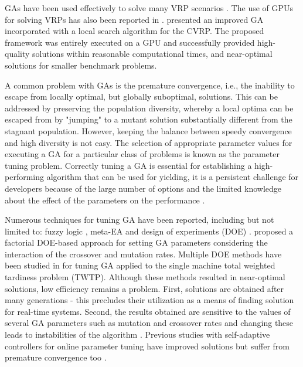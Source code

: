 \documentclass[acmsmall]{acmart}
\begin{document}
GAs have been used effectively to solve many VRP scenarios \cite{baker2003genetic, garcia2009comparison}. The use of GPUs for solving VRPs has also been reported in  \cite{rey2018cpu, wodecki2015parallel}.  \cite{abdelatti2020improved} presented an improved GA incorporated with a local search algorithm for the CVRP. The proposed framework was entirely executed on a GPU and successfully provided high-quality solutions within reasonable computational times, and near-optimal solutions for smaller benchmark problems.

A common problem with GAs is the premature convergence, i.e., the inability to escape from locally optimal, but globally suboptimal, solutions. This can be addressed by preserving the population diversity, whereby a local optima can be escaped from by "jumping" to a mutant solution substantially different from the stagnant population. However, keeping the balance between speedy convergence and high diversity is not easy. The selection of appropriate parameter values for executing a GA for a particular class of problems is known as the parameter tuning problem. Correctly tuning a GA is essential for establishing a high-performing algorithm that can be used for yielding, it is a persistent challenge for developers because of the large number of options and the limited knowledge about the effect of the parameters on the performance \cite{karafotias2014parameter}.

Numerous techniques for tuning GA have been reported, including but not limited to: fuzzy logic \cite{shirazi2016fuzzy}, meta-EA \cite{grefenstette1986optimization} and design of experiments (DOE) \cite{ arin2011comparative}. \cite{bagchi1996calibration} proposed a factorial DOE-based approach for setting GA parameters considering the interaction of the crossover and mutation rates. Multiple DOE methods have been studied in \cite{arin2011comparative} for tuning GA applied to the single machine total weighted tardiness problem (TWTP). Although these methods resulted in near-optimal solutions, low efficiency remains a problem. First, solutions are obtained after many generations - this precludes their utilization as a means of finding solution for real-time systems. Second, the results obtained are sensitive to the values of several GA parameters such as mutation and crossover rates and changing these leads to instabilities of the algorithm \cite{karafotias2015evaluating}. Previous studies with self-adaptive controllers for online parameter tuning have improved solutions but suffer from premature convergence too \cite{aleti2016systematic}.
\end{document}
